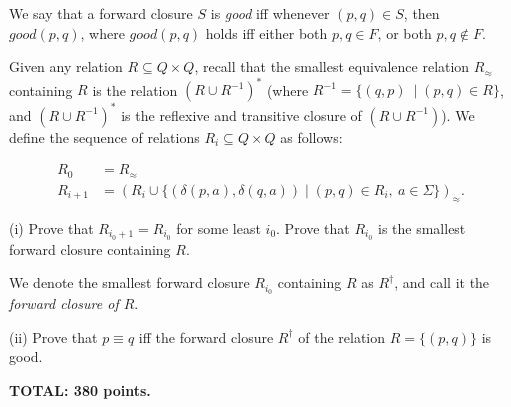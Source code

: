 \documentclass[12pt]{article}
\begin{document}
\medskip
We say that a forward closure $S$ is {\it good\/} iff 
whenever $(p, q)\in S$, then $good(p, q)$, where 
$good(p, q)$ holds iff either both $p, q\in F$, or
both $p, q\notin F$.

\medskip
Given any relation $R\subseteq Q\times Q$,
recall that the smallest equivalence relation $R_\approx$ containing
$R$ is the relation $(R \cup R^{-1})^*$
(where $R^{-1} = \{(q, p)\ \mid (p, q)\in R\}$, and 
$(R \cup R^{-1})^*$ is the reflexive and transitive closure of 
$(R \cup R^{-1})$).
We define the sequence of relations $R_i\subseteq Q\times Q$
as follows:

\begin{align*}
R_0 &= R_{\approx}\\
R_{i + 1} &= (R_{i} \cup 
\{(\delta(p, a), \delta(q, a)) \mid (p, q)\in R_i,\ a\in \Sigma\})_{\approx}.
\end{align*}

\medskip
(i) Prove that $R_{i_{0}+1} = R_{i_{0}}$ for some least $i_0$.
Prove that $R_{i_{0}}$ is the smallest forward closure
containing $R$.
 
\medskip
We denote the smallest forward closure $R_{i_{0}}$ containing $R$ as
$R^{\dagger}$, and call it the
{\it forward closure of $R$\/}.

\medskip
(ii) Prove that $p\equiv q$ iff the forward closure $R^{\dagger}$ of the
relation $R = \{(p, q)\}$ is good.



\vspace{0.5cm}\noindent
{\bf TOTAL: 380 points.}
\end{document}
